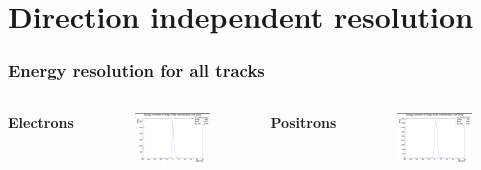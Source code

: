 \documentclass{beamer}
\begin{document}
	\section{Direction independent resolution}
	
		\begin{frame}
			\frametitle{Energy resolution for all tracks}
			\begin{columns}
				\centering
				\Large \textbf{Electrons}
				\begin{figure}
					\centering
					\includegraphics[width = 0.95 \linewidth]{images/c_e_delta_energy.png}
				\end{figure}
				\centering
				\Large \textbf{Positrons}
				\begin{figure}
					\centering
					\includegraphics[width = 0.95 \linewidth]{images/c_p_delta_energy.png}
				\end{figure}
			\end{columns}
		\end{frame}
\end{document}
